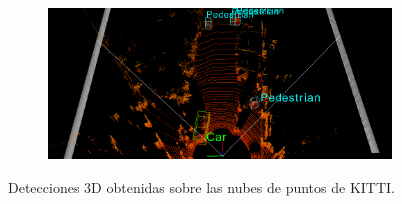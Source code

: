 \begin{figure}[H]
\begin{subfigure}[t]{.48\textwidth}
    \centering
    \includegraphics[width=\linewidth]{Book/figures/9_completo/complete_3.png}
  \end{subfigure}
\caption{Detecciones 3D obtenidas sobre las nubes de puntos de KITTI.}
\label{fig:Detecciones 3D obtenidas sobre las nubes de puntos de KITTI.}
\end{figure}

